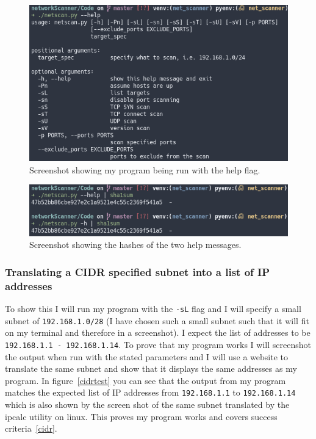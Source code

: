 \documentclass[titlepage]{article}
\let\Oldsubsubsection\subsubsection{}
\renewcommand{\subsubsection}{\FloatBarrier\Oldsubsubsection}
\begin{document}
\begin{figure}[H]
  \centering
  \includegraphics[width=\textwidth]{screenshots/helpmessage.png}
  \caption{%
    Screenshot showing my program being run with the help flag.
  }\label{helpflagtest}
\end{figure}

\begin{figure}[H]
  \centering
  \includegraphics[width=\textwidth]{screenshots/messagehashes.png}
  \caption{%
    Screenshot showing the hashes of the two help messages.
  }\label{messagehash}
\end{figure}

\subsubsection{Translating a CIDR specified subnet into a list of IP addresses}
To show this I will run my program with the \verb|-sL| flag and I will specify
a small subnet of \verb|192.168.1.0/28| (I have chosen such a small subnet
such that it will fit on my terminal and therefore in a screenshot).
I expect the list of addresses to be \verb|192.168.1.1 - 192.168.1.14|.
To prove that my program works I will screenshot the output when run with the
stated parameters and I will use a website to translate the same subnet and show
that it displays the same addresses as my program.
In figure~\ref{cidrtest} you can see that the output from my program matches
the expected list of IP addresses from \verb|192.168.1.1| to \verb|192.168.1.14|
which is also shown by the screen shot of the same subnet translated by
the ipcalc utility on linux.
This proves my program works and covers success criteria~\ref{cidr}.
\end{document}
